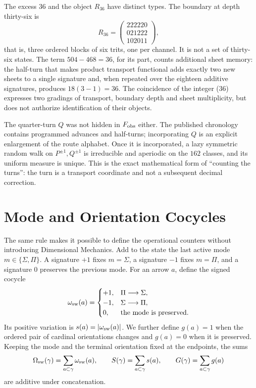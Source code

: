 The excess \(36\) and the object \(R_{36}\) have distinct types. The boundary
at depth thirty-six is
\[
 R_{36}=
 \begin{pmatrix}
 222220\\021222\\102011
 \end{pmatrix},
\]
that is, three ordered blocks of six trits, one per channel. It is not a set of thirty-six states. The term \(504-468=36\), for its part, counts additional sheet memory: the half-turn that makes product transport functional adds exactly two new sheets to a single signature and, when repeated over the eighteen additive signatures, produces \(18(3-1)=36\). The coincidence of the integer (36) expresses two gradings of transport, boundary depth and sheet multiplicity, but does not authorize identification of their objects.

The quarter-turn \(Q\) was not hidden in \(F_{\rm obs}\) either. The
published chronology contains programmed advances and half-turns; incorporating
\(Q\) is an explicit enlargement of the route alphabet. Once it is incorporated,
a lazy symmetric random walk on \(P^{\pm1},Q^{\pm1}\) is irreducible and
aperiodic on the \(162\) classes, and its uniform measure is unique. This is the
exact mathematical form of “counting the turns”: the turn is a transport
coordinate and not a subsequent decimal correction.

\section{Mode and Orientation Cocycles}
\label{sec:cociclos-modo-orientacion}

The same rule makes it possible to define the operational counters without introducing
Dimensional Mechanics. Add to the state the last active mode
\(m\in\{\Sigma,\Pi\}\). A signature \(+1\) fixes \(m=\Sigma\), a signature
\(-1\) fixes \(m=\Pi\), and a signature \(0\) preserves the previous mode. For an
arrow \(a\), define the signed cocycle
\[
 \omega_{\rm sw}(a)=
 \begin{cases}
  +1,&\Pi\longrightarrow\Sigma,\\
  -1,&\Sigma\longrightarrow\Pi,\\
  0,&\text{the mode is preserved}.
 \end{cases}
\]
Its positive variation is \(s(a)=|\omega_{\rm sw}(a)|\). We further define
\(g(a)=1\) when the ordered pair of cardinal orientations changes and
\(g(a)=0\) when it is preserved. Keeping the mode and the terminal
orientation fixed at the endpoints, the sums
\[
 \Omega_{\rm sw}(\gamma)=\sum_{a\subset\gamma}\omega_{\rm sw}(a),
 \qquad
 S(\gamma)=\sum_{a\subset\gamma}s(a),
 \qquad
 G(\gamma)=\sum_{a\subset\gamma}g(a)
\]
are additive under concatenation.

